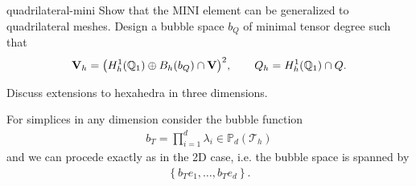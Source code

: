 \begin{Problem}{quadrilateral-mini}
  Show that the MINI element can be generalized to quadrilateral
  meshes. Design a bubble space $b_Q$ of minimal tensor degree such that
  \begin{gather}
    \mathbf V_h = \bigl(H^1_h(\mathbb Q_1) \oplus B_h(b_Q) \cap \mathbf V\bigr)^2,
    \qquad
    Q_h = H^1_h(\mathbb Q_1) \cap Q.
  \end{gather}

  Discuss extensions to hexahedra in three dimensions.
\begin{solution}
  For simplices in any dimension consider the bubble function
  \begin{align}
    b_T=\prod_{i=1}^d\lambda_i\in \mathbb{P}_d(\mathcal{T}_h)
  \end{align}
  and we can procede exactly as in the 2D case, i.e. the bubble
  space is spanned by
  \begin{align}
   \left\{b_T e_1,\dotsc, b_T e_d\right\}.
  \end{align}


\end{solution}
\end{Problem}
